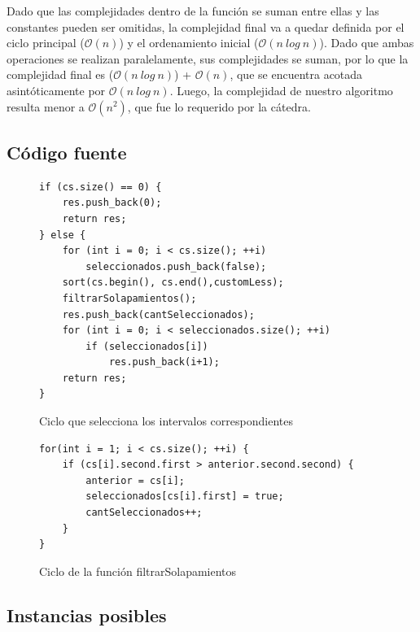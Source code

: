Dado que las complejidades dentro de la función se suman entre ellas y las constantes pueden ser omitidas, la complejidad final va a quedar definida por el ciclo principal ($\mathcal{O}(n)$) y el ordenamiento inicial ($\mathcal{O}(n\ log\ n)$). Dado que ambas operaciones se realizan paralelamente, sus complejidades se suman, por lo que la complejidad final es ($\mathcal{O}(n\ log\ n)$) + $\mathcal{O}(n)$, que se encuentra acotada asintóticamente por $\mathcal{O}(n\ log\ n)$. Luego, la complejidad de nuestro algoritmo resulta menor a $\mathcal{O}(n^2)$, que fue lo requerido por la cátedra.

\subsection{Código fuente}

\begin{figure}[H]
\begin{center}
\begin{verbatim}
if (cs.size() == 0) {
    res.push_back(0);
    return res;
} else {
    for (int i = 0; i < cs.size(); ++i)
        seleccionados.push_back(false);
    sort(cs.begin(), cs.end(),customLess);
    filtrarSolapamientos();
    res.push_back(cantSeleccionados);
    for (int i = 0; i < seleccionados.size(); ++i)
        if (seleccionados[i])
            res.push_back(i+1);
    return res;
}
\end{verbatim}
\caption{Ciclo que selecciona los intervalos correspondientes}
\end{center}
\end{figure}

\begin{figure}[H]
\begin{center}
\begin{verbatim}
for(int i = 1; i < cs.size(); ++i) {
    if (cs[i].second.first > anterior.second.second) {
        anterior = cs[i];
        seleccionados[cs[i].first] = true;
        cantSeleccionados++;
    }
}
\end{verbatim}
\caption{Ciclo de la función filtrarSolapamientos}
\end{center}
\end{figure}

\subsection{Instancias posibles}


